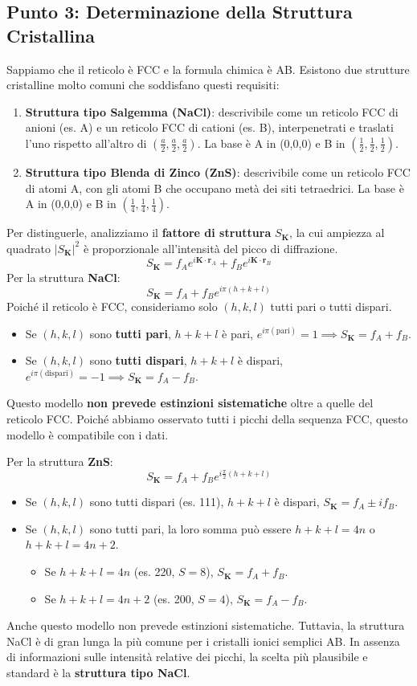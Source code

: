 \subsection{Punto 3: Determinazione della Struttura Cristallina}
Sappiamo che il reticolo è FCC e la formula chimica è AB. Esistono due strutture cristalline molto comuni che soddisfano questi requisiti:
\begin{enumerate}
    \item \textbf{Struttura tipo Salgemma (NaCl)}: descrivibile come un reticolo FCC di anioni (es. A) e un reticolo FCC di cationi (es. B), interpenetrati e traslati l'uno rispetto all'altro di $(\frac{a}{2}, \frac{a}{2}, \frac{a}{2})$. La base è A in (0,0,0) e B in $(\frac{1}{2}, \frac{1}{2}, \frac{1}{2})$.
    \item \textbf{Struttura tipo Blenda di Zinco (ZnS)}: descrivibile come un reticolo FCC di atomi A, con gli atomi B che occupano metà dei siti tetraedrici. La base è A in (0,0,0) e B in $(\frac{1}{4}, \frac{1}{4}, \frac{1}{4})$.
\end{enumerate}
Per distinguerle, analizziamo il \textbf{fattore di struttura} $S_\mathbf{K}$, la cui ampiezza al quadrato $|S_\mathbf{K}|^2$ è proporzionale all'intensità del picco di diffrazione.
$$ S_\mathbf{K} = f_A e^{i\mathbf{K} \cdot \mathbf{r}_A} + f_B e^{i\mathbf{K} \cdot \mathbf{r}_B} $$
Per la struttura \textbf{NaCl}:
$$ S_\mathbf{K} = f_A + f_B e^{i\pi(h+k+l)} $$
Poiché il reticolo è FCC, consideriamo solo $(h,k,l)$ tutti pari o tutti dispari.
\begin{itemize}
    \item Se $(h,k,l)$ sono \textbf{tutti pari}, $h+k+l$ è pari, $e^{i\pi(\text{pari})}=1 \implies S_\mathbf{K} = f_A + f_B$.
    \item Se $(h,k,l)$ sono \textbf{tutti dispari}, $h+k+l$ è dispari, $e^{i\pi(\text{dispari})}=-1 \implies S_\mathbf{K} = f_A - f_B$.
\end{itemize}
Questo modello \textbf{non prevede estinzioni sistematiche} oltre a quelle del reticolo FCC. Poiché abbiamo osservato tutti i picchi della sequenza FCC, questo modello è compatibile con i dati.

Per la struttura \textbf{ZnS}:
$$ S_\mathbf{K} = f_A + f_B e^{i\frac{\pi}{2}(h+k+l)} $$
\begin{itemize}
    \item Se $(h,k,l)$ sono tutti dispari (es. 111), $h+k+l$ è dispari, $S_\mathbf{K} = f_A \pm i f_B$.
    \item Se $(h,k,l)$ sono tutti pari, la loro somma può essere $h+k+l=4n$ o $h+k+l=4n+2$.
        \begin{itemize}
            \item Se $h+k+l=4n$ (es. 220, $S=8$), $S_\mathbf{K} = f_A + f_B$.
            \item Se $h+k+l=4n+2$ (es. 200, $S=4$), $S_\mathbf{K} = f_A - f_B$.
        \end{itemize}
\end{itemize}
Anche questo modello non prevede estinzioni sistematiche. Tuttavia, la struttura NaCl è di gran lunga la più comune per i cristalli ionici semplici AB. In assenza di informazioni sulle intensità relative dei picchi, la scelta più plausibile e standard è la \textbf{struttura tipo NaCl}.

